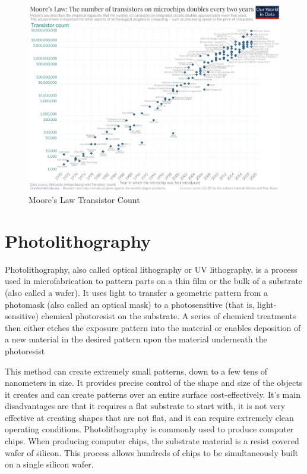 \documentclass[12pt,a4paper]{report}
\begin{document}
\begin{figure}
  \centering
  \includegraphics[scale=0.3]{Moore's_Law_Transistor_Count.png}
  \caption{Moore's Law Transistor Count}
  \label{moores}
  \end{figure}

\section{Photolithography}
Photolithography, also called optical lithography or UV lithography, 
is a process used in 
microfabrication to pattern parts on a thin film or the bulk of 
a substrate (also called a wafer). 
It uses light to transfer a geometric pattern from a photomask 
(also called an optical mask) to 
a photosensitive (that is, light-sensitive) chemical photoresist 
on the substrate. A series of 
chemical treatments then either etches the exposure pattern into 
the material or enables deposition 
of a new material in the desired pattern upon the material 
underneath the photoresist

This method can create extremely small patterns, down to a few 
tens of nanometers in size. 
It provides precise control of the shape and size of the objects 
it creates and can create 
patterns over an entire surface cost-effectively. It's main 
disadvantages are that it requires 
a flat substrate to start with, it is not very effective at 
creating shapes that are not flat, 
and it can require extremely clean operating conditions. 
Photolithography is commonly used to produce computer chips. 
When producing computer chips, 
the substrate material is a resist covered wafer of silicon. 
This process allows hundreds of 
chips to be simultaneously built on a single silicon wafer.
\end{document}
